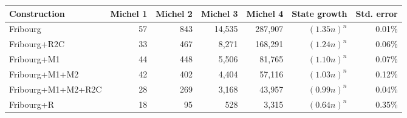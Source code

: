 \begin{tabular}{lrrrrrr}
  \hline
Construction & Michel 1 & Michel 2 & Michel 3 & Michel 4 & State growth & Std. error \\ 
  \hline
Fribourg & 57 & 843 & 14,535 & 287,907 & $(1.35n)^n$ & 0.01\% \\ 
  Fribourg+R2C & 33 & 467 & 8,271 & 168,291 & $(1.24n)^n$ & 0.06\% \\ 
  Fribourg+M1 & 44 & 448 & 5,506 & 81,765 & $(1.10n)^n$ & 0.07\% \\ 
  Fribourg+M1+M2 & 42 & 402 & 4,404 & 57,116 & $(1.03n)^n$ & 0.12\% \\ 
  Fribourg+M1+M2+R2C & 28 & 269 & 3,168 & 43,957 & $(0.99n)^n$ & 0.04\% \\ 
  Fribourg+R & 18 & 95 & 528 & 3,315 & $(0.64n)^n$ & 0.35\% \\ 
   \hline
\end{tabular}
